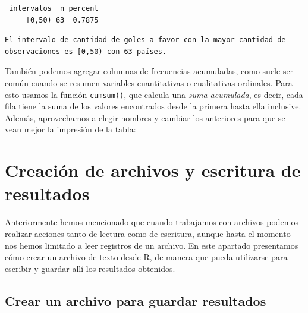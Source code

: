 \documentclass[
]{book}
\newenvironment{Shaded}{\begin{snugshade}}{\end{snugshade}}
\newcommand{\FunctionTok}[1]{\textcolor[rgb]{0.00,0.00,0.00}{#1}}
\newcommand{\NormalTok}[1]{#1}
\newcommand{\SpecialCharTok}[1]{\textcolor[rgb]{0.00,0.00,0.00}{#1}}
\newcommand{\StringTok}[1]{\textcolor[rgb]{0.31,0.60,0.02}{#1}}
\begin{document}
\begin{verbatim}
 intervalos  n percent
     [0,50) 63  0.7875
\end{verbatim}

\begin{Shaded}
\end{Shaded}

\begin{verbatim}
El intervalo de cantidad de goles a favor con la mayor cantidad de observaciones es [0,50) con 63 países.
\end{verbatim}

También podemos agregar columnas de frecuencias acumuladas, como suele ser común cuando se resumen variables cuantitativas o cualitativas ordinales. Para esto usamos la función \texttt{cumsum()}, que calcula una \emph{suma acumulada}, es decir, cada fila tiene la suma de los valores encontrados desde la primera hasta ella inclusive. Además, aprovechamos a elegir nombres y cambiar los anteriores para que se vean mejor la impresión de la tabla:

\hypertarget{creaciuxf3n-de-archivos-y-escritura-de-resultados}{%
\section{Creación de archivos y escritura de resultados}\label{creaciuxf3n-de-archivos-y-escritura-de-resultados}}

Anteriormente hemos mencionado que cuando trabajamos con archivos podemos realizar acciones tanto de lectura como de escritura, aunque hasta el momento nos hemos limitado a leer registros de un archivo. En este apartado presentamos cómo crear un archivo de texto desde R, de manera que pueda utilizarse para escribir y guardar allí los resultados obtenidos.

\hypertarget{crear-un-archivo-para-guardar-resultados}{%
\subsection{Crear un archivo para guardar resultados}\label{crear-un-archivo-para-guardar-resultados}}
\end{document}
